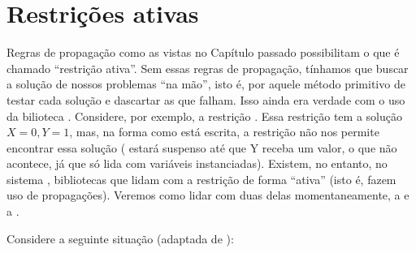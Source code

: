 
%

%

\section{Restrições ativas}

Regras de propagação como as vistas no Capítulo passado possibilitam o que é chamado ``restrição
ativa''. Sem essas regras de
propagação, tínhamos que buscar a solução de nossos problemas ``na mão'', isto é, por aquele método primitivo de testar cada
solução e dascartar as que falham. Isso ainda era verdade com o uso da bilioteca
. Considere, por exemplo, a restrição . Essa restrição tem a solução ${X=0,Y=1}$, mas, na forma como está escrita, a restrição
não nos permite encontrar essa solução ( estará suspenso até que Y receba um valor, o
que não acontece, já que  só lida com variáveis instanciadas). Existem, no entanto, no
sistema \eclipse, bibliotecas que lidam com a restrição de forma ``ativa''
(isto é, fazem uso de propagações). Veremos como lidar com duas delas momentaneamente, a
 e a .

Considere a seguinte situação (adaptada de \cite{antoni}):

